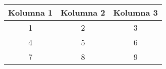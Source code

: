 
    \begin{tabular}{|c|c|c|}
        \hline
        Kolumna 1 & Kolumna 2 & Kolumna 3 \\
        \hline
        1& 2 & 3 \\
        4 & 5 & 6 \\
        7 & 8 & 9 \\
        \hline
    \end{tabular}
 